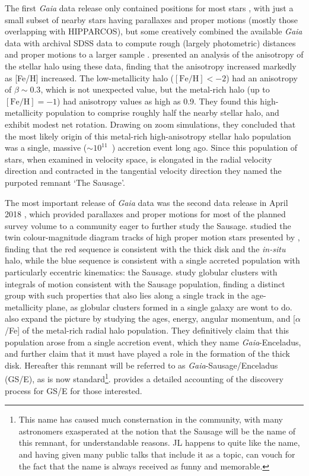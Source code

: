 The first \textit{Gaia} data release only contained positions for most stars \parencite{gaiadr1}, with just a small subset of nearby stars having parallaxes and proper motions (mostly those overlapping with HIPPARCOS), but some creatively combined the available \textit{Gaia} data with archival SDSS data to compute rough (largely photometric) distances and proper motions to a larger sample \parencite{deason17,deboer18}. \textcite{belokurov18} presented an analysis of the anisotropy of the stellar halo using these data, finding that the anisotropy increased markedly as [Fe/H] increased. The low-metallicity halo ($\mathrm{[Fe/H]} < -2$) had an anisotropy of $\beta \sim 0.3$, which is not unexpected value, but the metal-rich halo (up to $\mathrm{[Fe/H]}=-1$) had anisotropy values as high as 0.9. They found this high-metallicity population to comprise roughly half the nearby stellar halo, and exhibit modest net rotation. Drawing on zoom simulations, they concluded that the most likely origin of this metal-rich high-anisotropy stellar halo population was a single, massive ($\sim 10^{11}$~\Msun) accretion event long ago. Since this population of stars, when examined in velocity space, is elongated in the radial velocity direction and contracted in the tangential velocity direction they named the purpoted remnant `The Sausage'.

The most important release of \textit{Gaia} data was the second data release in April 2018 \parencite{gaiadr2}, which provided parallaxes and proper motions for most of the planned survey volume to a community eager to further study the Sausage. \textcite{haywood18} studied the twin colour-magnitude diagram tracks of high proper motion stars presented by \textcite{gaiadr2_hrdiagram}, finding that the red sequence is consistent with the thick disk and the \textit{in-situ} halo, while the blue sequence is consistent with a single accreted population with particularly eccentric kinematics: the Sausage. \textcite{myeong18} study globular clusters with integrals of motion consistent with the Sausage population, finding a distinct group with such properties that also lies along a single track in the age-metallicity plane, as globular clusters formed in a single galaxy are wont to do. \textcite{helmi18} also expand the picture by studying the ages, energy, angular momentum, and [$\alpha$/Fe] of the metal-rich radial halo population. They definitively claim that this population arose from a single accretion event, which they name \textit{Gaia}-Enceladus, and further claim that it must have played a role in the formation of the thick disk. Hereafter this remnant will be referred to as \textit{Gaia}-Sausage/Enceladus (GS/E), as is now standard\footnote{This name has caused much consternation in the community, with many astronomers exasperated at the notion that the Sausage will be the name of this remnant, for understandable reasons. JL happens to quite like the name, and having given many public talks that include it as a topic, can vouch for the fact that the name is always received as funny and memorable.}. \textcite{deason24} provides a detailed accounting of the discovery process for GS/E for those interested.

